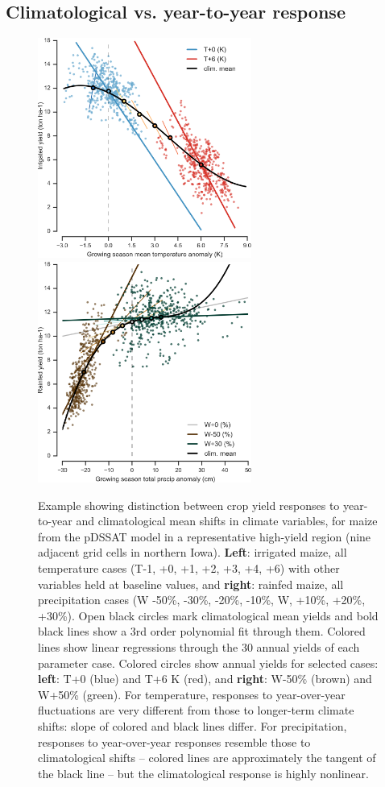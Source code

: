 \documentclass[gmd, manuscript]{copernicus} %
\begin{document}
\subsection{Climatological vs. year-to-year response}
\begin{figure}[ht]
\centering
   \includegraphics[width=7cm]{figures/tempyearvclim.png} \hspace{10mm} \includegraphics[width=7cm]{figures/pryearvclim.png}
   \caption{
	   Example showing distinction between crop yield responses to year-to-year and climatological mean shifts in climate variables, for  
       maize from the pDSSAT model in a representative high-yield region (nine adjacent grid cells in northern Iowa). 	\textbf{Left}: irrigated maize, all temperature cases (T-1, +0, +1, +2, +3, +4, +6) with other variables held at baseline values, and \textbf{right}: rainfed maize, all precipitation cases (W -50\%, -30\%, -20\%, -10\%, W, +10\%, +20\%, +30\%).
       Open black circles mark climatological mean yields and bold black lines show a 3rd order polynomial fit through them. Colored lines show linear regressions through the 30 annual yields of each parameter case. Colored circles show annual yields for selected cases:
       \textbf{left}: T+0 (blue) and T+6 K (red), and \textbf{right}: W-50\% (brown) and W+50\% (green).
       For temperature, responses to year-over-year fluctuations are very different from those to longer-term climate shifts: slope of colored and black lines differ. For precipitation, responses to year-over-year responses resemble those to climatological shifts -- colored lines are approximately the tangent of the black line -- but the climatological response is highly nonlinear. 
   }
   \label{fig:yearvclim}
\end{figure}
\end{document}
